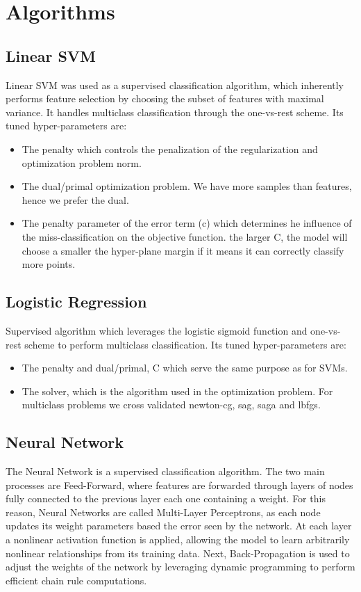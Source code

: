 \documentclass[10pt, hidelinks]{article}
\begin{document}
\section*{Algorithms}
\subsection*{Linear SVM}
Linear SVM was used as a supervised classification algorithm, which inherently performs feature selection by
choosing the subset of features with maximal variance. It handles multiclass classification through
the one-vs-rest scheme. Its tuned hyper-parameters are:
\begin{itemize}
    \item The penalty which controls the penalization of the regularization and optimization problem norm.
    \item The dual/primal optimization problem. We have more samples than features, hence we prefer the dual.
	\item The penalty parameter of the error term (c) which determines he influence of the
		miss-classification on the objective function. the larger C, the model will choose a smaller
		the hyper-plane margin if it means it can correctly classify more points. 
\end{itemize}
\subsection*{Logistic Regression}
Supervised algorithm which leverages the logistic sigmoid function and one-vs-rest scheme to perform
multiclass classification. Its tuned hyper-parameters are:
\begin{itemize}
    \item The penalty and dual/primal, C which serve the same purpose as for SVMs.
	\item The solver, which is the algorithm used in the optimization problem. For multiclass
		problems we cross validated newton-cg, sag, saga and lbfgs.
\end{itemize}
\subsection*{Neural Network}
The Neural Network is a supervised classification algorithm. The two main processes are
Feed-Forward, where features are
forwarded through layers of nodes fully connected to the previous layer each one containing a
weight. For this reason, Neural Networks are called Multi-Layer Perceptrons, as each node updates
its weight parameters based the error seen by the network.
At each layer a nonlinear activation function is applied, allowing the model to learn arbitrarily
nonlinear relationships from its training data. Next, Back-Propagation is used to adjust the weights
of the network by leveraging dynamic programming to perform efficient chain rule computations.
\end{document}
